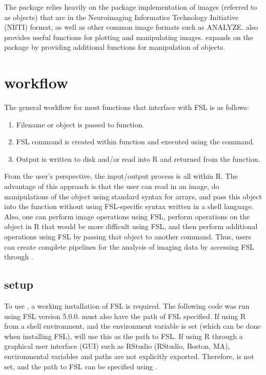 The  package relies heavily on the  \citep{whitcher_working_2011} package implementation of images (referred to as  objects) that are in the Neuroimaging Informatics Technology Initiative (NIfTI) format, as well as other common image formats such as ANALYZE.   also provides useful functions for plotting and manipulating images.   expands on the  package by providing additional functions for manipulation of  objects.


\section{ workflow}
The general workflow for most  functions that interface with FSL is as follows:
\begin{enumerate}
\item Filename or  object is passed to  function.
\item FSL command is created within  function and executed using the  command.
\item Output is written to disk and/or read into R and returned from the function.
\end{enumerate}

From the user's perspective, the input/output process is all within R.  The advantage of this approach is that the user can read in an image, do manipulations of the  object using standard syntax for arrays, and pass this object into the  function without using FSL-specific syntax written in a shell language.  Also, one can perform image operations using FSL, perform operations on the  object in R that would be more difficult using FSL, and then perform additional operations using FSL by passing that object to another  command.  Thus, users can create complete pipelines for the analysis of imaging data by accessing FSL through . 

\subsection{ setup}
To use , a working installation of FSL is required.  The following code was run using FSL version 5.0.0.  must also have the path of FSL specified.  If using R from a shell environment, and the  environment variable is set (which can be done when installing FSL),  will use this as the path to FSL.  If using R through a graphical user interface (GUI) such as RStudio (RStudio, Boston, MA), environmental variables and paths are not explicitly exported.  Therefore,  is not set, and the path to FSL can be specified using . 

